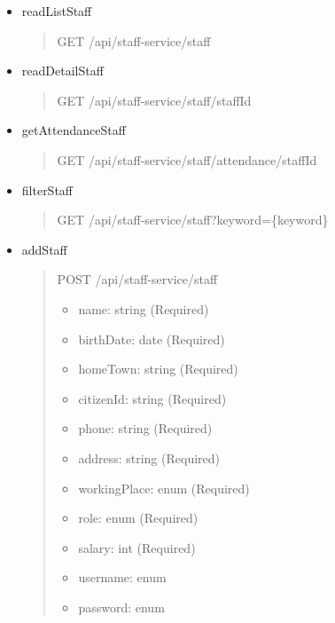 \begin{itemize}
	\item readListStaff
	      \begin{quote}
		      GET /api/staff-service/staff
	      \end{quote}

	\item readDetailStaff
	      \begin{quote}
		      GET /api/staff-service/staff/{staffId}
	      \end{quote}

	\item getAttendanceStaff
	      \begin{quote}
		      GET /api/staff-service/staff/attendance/{staffId}
	      \end{quote}

	\item filterStaff
	      \begin{quote}
		      GET /api/staff-service/staff?keyword=\{keyword\}
	      \end{quote}

	\item addStaff
	      \begin{quote}
		      POST /api/staff-service/staff
		      \begin{itemize}
			      \item name: string (Required)
			      \item birthDate: date (Required)
			      \item homeTown: string (Required)
			      \item citizenId: string (Required)
			      \item phone: string (Required)
			      \item address: string (Required)
			      \item workingPlace: enum (Required)
			      \item role: enum (Required)
			      \item salary: int (Required)
			      \item username: enum
			      \item password: enum
		      \end{itemize}
	      \end{quote}


\end{itemize}
